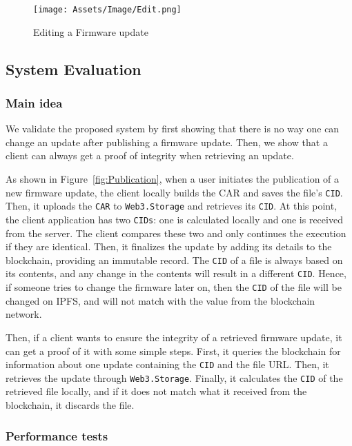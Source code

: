 \documentclass[conference]{IEEEtran}
\begin{document}
\begin{figure}[t]
\centering
\texttt{[image: Assets/Image/Edit.png]}
\caption{Editing a Firmware update}
\label{fig:Edit}
\vspace{-3mm}
\end{figure}

\subsection{System Evaluation}

\subsubsection{Main idea} We validate the proposed system by first showing that there is no way one can change an update after publishing a firmware update. Then, we show that a client can always get a proof of integrity when retrieving an update.

As shown in Figure~\ref{fig:Publication}, when a user initiates the publication of a new firmware update, the client locally builds the CAR and saves the file's \texttt{CID}. Then, it uploads the \texttt{CAR} to \texttt{Web3.Storage} and retrieves its \texttt{CID}. At this point, the client application has two \texttt{CIDs}: one is calculated locally and one is received from the server. The client compares these two and only continues the execution if they are identical. Then, it finalizes the update by adding its details to the blockchain, providing an immutable record. The \texttt{CID} of a file is always based on its contents, and any change in the contents will result in a different \texttt{CID}. Hence, if someone tries to change the firmware later on, then the \texttt{CID} of the file will be changed on IPFS, and will not match with the value from the blockchain network.

Then, if a client wants to ensure the integrity of a retrieved firmware update, it can get a proof of it with some simple steps. First, it queries the blockchain for information about one update containing the \texttt{CID} and the file URL. Then, it retrieves the update through \texttt{Web3.Storage}. Finally, it calculates the \texttt{CID} of the retrieved file locally, and if it does not match what it received from the blockchain, it discards the file.

\subsubsection{Performance tests}\label{sec:test}
\end{document}
